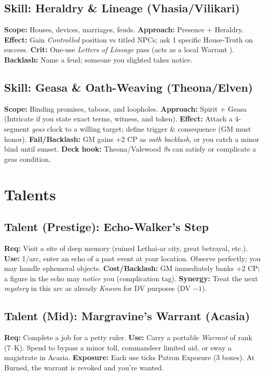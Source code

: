 \subsection{Skill: Heraldry \& Lineage (Vhasia/Vilikari)}
\textbf{Scope:} Houses, devices, marriages, feuds.
\textbf{Approach:} Presence + Heraldry.
\textbf{Effect:} Gain \emph{Controlled} position vs titled NPCs; ask 1 specific House-Truth on success.
\textbf{Crit:} One-use \emph{Letters of Lineage} pass (acts as a local Warrant \SuitDiamond{}).
\textbf{Backlash:} Name a feud; someone you slighted takes notice.

\subsection{Skill: Geasa \& Oath-Weaving (Theona/Elven)}
\textbf{Scope:} Binding promises, taboos, and loopholes.
\textbf{Approach:} Spirit + Geasa (Intricate if you state exact terms, witness, and token).
\textbf{Effect:} Attach a 4-segment \emph{geas} clock to a willing target; define trigger \& consequence (GM must honor).
\textbf{Fail/Backlash:} GM gains +2 CP as \emph{oath backlash}, or you catch a minor bind until sunset.
\textbf{Deck hook:} Theona/Valewood \emph{9s} can satisfy or complicate a geas condition.

\section{Talents}

\subsection{Talent (Prestige): Echo-Walker's Step}
\textbf{Req:} Visit a site of deep memory (ruined Lethai-ar city, great betrayal, etc.).
\textbf{Use:} 1/arc, enter an echo of a past event at your location. Observe perfectly; you may handle ephemeral objects.
\textbf{Cost/Backlash:} GM immediately banks +2 CP; a figure in the echo may \emph{notice} you (complication tag).
\textbf{Synergy:} Treat the next \emph{mystery} \SuitClub{} in this arc as already \emph{Known} for DV purposes (DV $-1$).

\subsection{Talent (Mid): Margravine's Warrant (Acasia)}
\textbf{Req:} Complete a job for a petty ruler.
\textbf{Use:} Carry a portable \SuitDiamond{} \emph{Warrant} of rank (7--K). Spend to bypass a minor toll, commandeer limited aid, or sway a magistrate in Acasia.
\textbf{Exposure:} Each use ticks Patron Exposure (3 boxes). At Burned, the warrant is revoked and you’re wanted.

